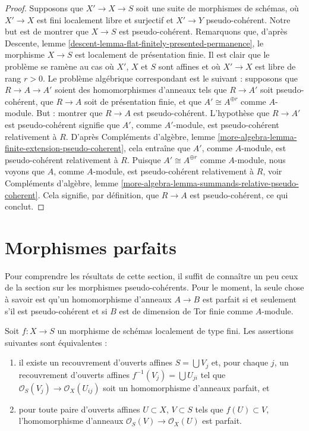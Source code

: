 \begin{proof}
\medskip\noindent
Supposons que $X' \to X \to S$ soit une suite de morphismes de schémas,
où $X' \to X$ est fini localement libre et surjectif et $X' \to Y$ pseudo-cohérent.
Notre but est de montrer que $X \to S$ est pseudo-cohérent.
Remarquons que, d'après
Descente, lemme \ref{descent-lemma-flat-finitely-presented-permanence},
le morphisme $X \to S$ est localement de présentation finie.
Il est clair que le problème se ramène au cas où $X'$, $X$ et $S$
sont affines et où $X' \to X$ est libre de rang $r > 0$. Le problème
algébrique correspondant est le suivant : supposons que $R \to A \to A'$ soient des homomorphismes d'anneaux
tels que $R \to A'$ soit pseudo-cohérent, que $R \to A$ soit de présentation finie,
et que $A' \cong A^{\oplus r}$ comme $A$-module. But : montrer que $R \to A$ est
pseudo-cohérent. L'hypothèse que $R \to A'$ est pseudo-cohérent
signifie que $A'$, comme $A'$-module, est pseudo-cohérent relativement à $R$. D'après
Compléments d'algèbre,
lemme \ref{more-algebra-lemma-finite-extension-pseudo-coherent},
cela entraîne que $A'$, comme $A$-module, est pseudo-cohérent relativement à $R$.
Puisque $A' \cong A^{\oplus r}$ comme $A$-module, nous voyons que
$A$, comme $A$-module, est pseudo-cohérent relativement à $R$, voir
Compléments d'algèbre,
lemme \ref{more-algebra-lemma-summands-relative-pseudo-coherent}.
Cela signifie, par définition, que $R \to A$ est pseudo-cohérent, ce qui conclut.
\end{proof}








\section{Morphismes parfaits}
\label{section-perfect}

\noindent
Pour comprendre les résultats de cette
section, il suffit de connaître un peu ceux de la section
sur les morphismes pseudo-cohérents.
Pour le moment, la seule chose à savoir est qu'un homomorphisme d'anneaux
$A \to B$ est parfait si et seulement s'il est pseudo-cohérent
et si $B$ est de dimension de Tor finie comme $A$-module.

\begin{lemma}
\label{lemma-perfect}
Soit $f : X \to S$ un morphisme de schémas localement de type fini.
Les assertions suivantes sont équivalentes :
\begin{enumerate}
\item il existe un recouvrement d'ouverts affines $S = \bigcup V_j$ et, pour chaque $j$,
un recouvrement d'ouverts affines $f^{-1}(V_j) = \bigcup U_{ji}$ tel que
$\mathcal{O}_S(V_j) \to \mathcal{O}_X(U_{ij})$ soit un homomorphisme
d'anneaux parfait, et
\item pour toute paire d'ouverts affines $U \subset X$, $V \subset S$
tels que $f(U) \subset V$, l'homomorphisme d'anneaux
$\mathcal{O}_S(V) \to \mathcal{O}_X(U)$ est parfait.
\end{enumerate}
\end{lemma}

